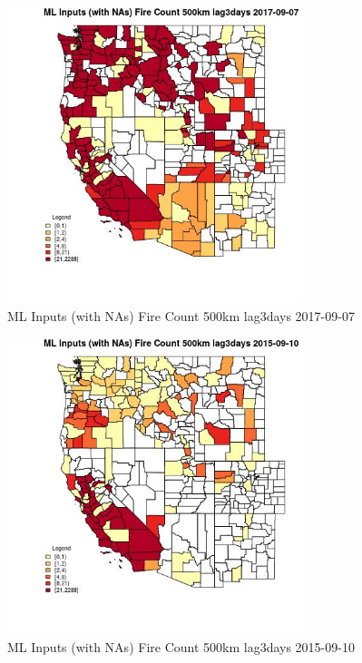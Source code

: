 \clearpage 

\begin{figure} 
\centering  
\includegraphics[width=0.77\textwidth]{Code_Outputs/Report_ML_input_PM25_Step4_part_e_de_duplicated_aves_compiled_2019-05-21wNAs_CountyFire_Count_500km_lag3daysMean2017-09-07.jpg} 
\caption{\label{fig:Report_ML_input_PM25_Step4_part_e_de_duplicated_aves_compiled_2019-05-21wNAsCountyFire_Count_500km_lag3daysMean2017-09-07}ML Inputs (with NAs) Fire Count 500km lag3days 2017-09-07} 
\end{figure} 
 

\begin{figure} 
\centering  
\includegraphics[width=0.77\textwidth]{Code_Outputs/Report_ML_input_PM25_Step4_part_e_de_duplicated_aves_compiled_2019-05-21wNAs_CountyFire_Count_500km_lag3daysMean2015-09-10.jpg} 
\caption{\label{fig:Report_ML_input_PM25_Step4_part_e_de_duplicated_aves_compiled_2019-05-21wNAsCountyFire_Count_500km_lag3daysMean2015-09-10}ML Inputs (with NAs) Fire Count 500km lag3days 2015-09-10} 
\end{figure} 
 

